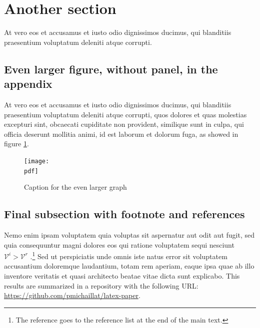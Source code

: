\documentclass[letterpaper,12pt,leqno]{article}
\newcommand{\pdf}{figures.pdf}
\begin{document}
\section{Another section}\label{a:appendix2}

At vero eos et accusamus et iusto odio dignissimos ducimus, qui blanditiis praesentium voluptatum deleniti atque corrupti.

\subsection{Even larger figure, without panel, in the appendix} 

At vero eos et accusamus et iusto odio dignissimos ducimus, qui blanditiis praesentium voluptatum deleniti atque corrupti, quos dolores et quas molestias excepturi sint, obcaecati cupiditate non provident, similique sunt in culpa, qui officia deserunt mollitia animi, id est laborum et dolorum fuga, as showed in figure \ref{f:appendix2}.

\begin{figure}[t]
\texttt{[image: \\pdf]}
\caption{Caption for the even larger graph}
\label{f:appendix2}\end{figure}


\subsection{Final subsection with footnote and references}\label{a:subappendix}

Nemo enim ipsam voluptatem quia voluptas sit aspernatur aut odit aut fugit, sed quia consequuntur magni dolores eos qui ratione voluptatem sequi nesciunt $\mathcal{V}^i > \mathcal{V}^r$ \citep{MS21b}.\footnote{The reference goes to the reference list at the end of the main text.} Sed ut perspiciatis unde omnis iste natus error sit voluptatem accusantium doloremque laudantium, totam rem aperiam, eaque ipsa quae ab illo inventore veritatis et quasi architecto beatae vitae dicta sunt explicabo. This results are summarized in a repository with the following URL: \url{https://github.com/pmichaillat/latex-paper}.
\end{document}
